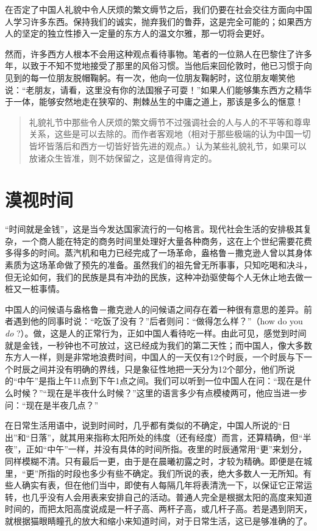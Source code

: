 \documentclass[12pt,oneside]{book}
\begin{document}
\begin{common-format}
在否定了中国人礼貌中令人厌烦的繁文缛节之后，我们仍要在社会交往方面向中国人学习许多东西。保持我们的诚实，抛弃我们的鲁莽，这是完全可能的；如果西方人的坚定的独立性掺入一定量的东方人的温文尔雅，那一切将会更好。 

然而，许多西方人根本不会用这种观点看待事物。笔者的一位熟人在巴黎住了许多年，以致于不知不觉地接受了那里的风俗习惯。当他后来回伦敦时，他已习惯于向见到的每一位朋友脱帽鞠躬。有一次，他向一位朋友鞠躬时，这位朋友嘲笑他说：“老朋友，请看，这里没有你的法国猴子可耍！”如果人们能够集东西方之精华于一体，能够安然地走在狭窄的、荆棘丛生的中庸之道上，那该是多么的惬意！

\begin{quotation}
礼貌礼节中那些令人厌烦的繁文缛节不过强调社会的人与人的不平等和尊卑关系，这些是可以去除的。而作者客观地（相对于那些极端的认为中国一切皆坏皆落后和西方一切皆好皆先进的观点。）认为某些礼貌礼节，如果可以放诸众生皆准，则不妨保留之，这是值得肯定的。 
\end{quotation}



\chapter{漠视时间}
“时间就是金钱”，这是当今发达国家流行的一句格言。现代社会生活的安排极其复杂，一个商人能在特定的商务时间里处理好大量各种商务，这在上个世纪需要花费多得多的时间。蒸汽机和电力已经完成了一场革命，盎格鲁－撒克逊人曾以其身体素质为这场革命做了预先的准备。虽然我们的祖先曾无所事事，只知吃喝和决斗，但无论如何，我们的民族是具有冲劲的民族，这种冲劲驱使每个人无休止地去做一桩又一桩事情。 

中国人的问候语与盎格鲁－撒克逊人的问候语之间存在着一种很有意思的差异。前者遇到他的同事时说：“吃饭了没有？”后者则问：“做得怎么样？”（how do you \textit{do} ?）。做，这是人的正常行为，正如中国人看待吃一样。由此可见，感觉到时间就是金钱，一秒钟也不可放过，这已经成为我们的第二天性；而中国人，像大多数东方人一样，则是非常地浪费时间，中国人的一天仅有12个时辰，一个时辰与下一个时辰之间并没有明确的界线，只是象征性地把一天分为12个部分，他们所说的“中午”是指上午11点到下午1点之间。我们可以听到一位中国人在问：“现在是什么时候？”“现在是半夜什么时候？”这里的语言多少有点模棱两可，他应当进一步问：“现在是半夜几点？” 

在日常生活用语中，说到时间时，几乎都有类似的不确定，中国人所说的“日出”和“日落”，就其用来指称太阳所处的纬度（还有经度）而言，还算精确，但“半夜”，正如“中午”一样，并没有具体的时间所指。夜里的时辰通常用“更”来划分，同样模糊不清。只有最后一更，由于是在晨曦初露之时，才较为精确。即便是在城里，“更”所指的时段也多少有些不确定。我们所说的表，绝大多数人一无所知。有些人确实有表，但在他们当中，即使有人每隔几年将表清洗一下，以保证它正常运转，也几乎没有人会用表来安排自己的活动。普通人完全是根据太阳的高度来知道时间的，而把太阳高度说成是一杆子高、两杆子高，或几杆子高。若是遇到阴天，就根据猫眼睛瞳孔的放大和缩小来知道时间，对于日常生活，这已是够准确的了。 


\end{common-format}
\end{document}
